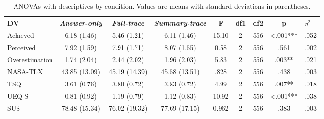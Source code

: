 \documentclass[acmlarge,review=true, anonymous=true]{acmart}
\begin{document}
\begin{table}[H]
\centering
\caption{ANOVAs with descriptives by condition. Values are means with standard deviations in parentheses.}

\begin{tabular}{lcccccccc}
\hline
DV                    & \textit{Answer-only}             & \textit{Full-trace}                 & \textit{Summary-trace} & F & df1 & df2 & p & \multicolumn{1}{l}{$\eta^2$} \\ \hline
Achieved  &    6.18 (1.46)      &      5.46 (1.21)     &       6.11 (1.46)           &       15.10           &              2        &      556                &      <.001***           &            .052         \\
Perceived &    7.92 (1.59)      &      7.91 (1.71)     &      8.07 (1.55)          &       0.58       &             2           &        556              &        .561        &           .002       \\
Overestimation &    1.74 (2.04)      &        2.44 (2.02)    &        1.96 (2.03)          &     5.83             &             2         &      556                &      .003**            &           .021           \\
NASA-TLX     & 43.85 (13.09)  & 45.19 (14.39)  & 45.58 (13.51)  &  .828 & 2 & 556 & .438 & .003  \\
TSQ                     & 3.61 (0.76)  & 3.80 (0.72)  & 3.83 (0.72)  & 4.99  & 2 & 556 & .007** & .018  \\
UEQ-S                     & 0.81 (0.92)  & 1.19 (0.79)  & 1.12 (0.83)  & 10.92  & 2 & 556 & <.001*** & .038  \\
SUS                     & 78.48 (15.34)  & 76.02 (19.32)  &  77.69 (17.15) & 0.962 & 2 & 556 & .383 & .003  \\ 

\hline
\end{tabular}





\end{table}
\end{document}

